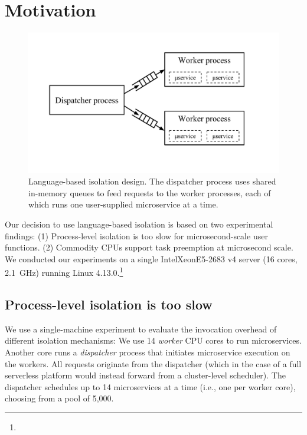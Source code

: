 \section{Motivation}
\label{sec:motive}

\begin{figure}
\includegraphics[width=\columnwidth]{figs/fancy_system}
\caption{Language-based isolation design.  The dispatcher process
uses shared in-memory queues to feed requests to the worker processes, each of
which runs one user-supplied microservice at a time.}
\label{fig:sysdesign}
\end{figure}

Our decision to use language-based isolation is based on two experimental
findings:  (1) Process-level isolation is too slow for
microsecond-scale user functions. (2) Commodity
CPUs support task preemption at microsecond scale.  We conducted our experiments
on a single Intel\textcopyright\@ Xeon\textcopyright\@ E5-2683 v4 server (16 cores, 2.1~GHz) running
Linux 4.13.0.\footnote{}

\subsection{Process-level isolation is too slow}
We use a single-machine experiment to evaluate the invocation overhead of different
isolation mechanisms: We use 14 \emph{worker} CPU cores to run microservices. Another
core runs a \emph{dispatcher} process that initiates microservice execution on the
workers.  All requests originate
from the dispatcher (which in the case of a full serverless platform would instead
forward from a cluster-level scheduler).  The dispatcher schedules up to 14
microservices at a time (i.e., one per worker core), choosing from a pool of 5,000.

